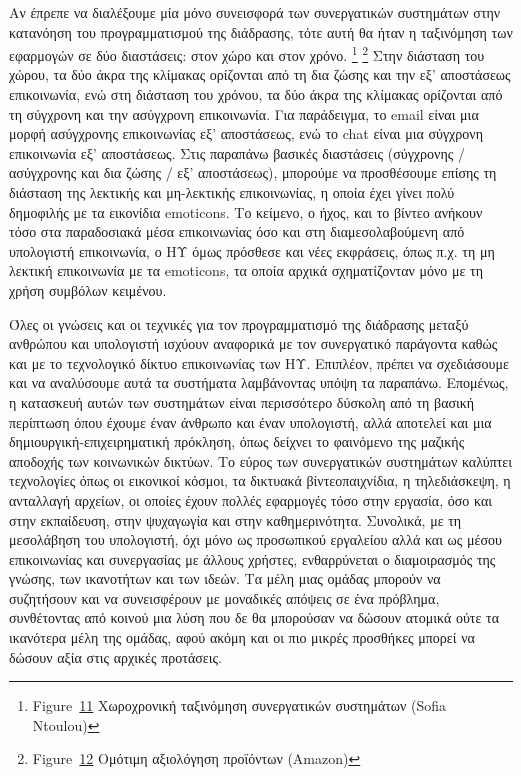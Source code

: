 \documentclass[
]{article}
\begin{document}
Αν έπρεπε να διαλέξουμε μία μόνο συνεισφορά των συνεργατικών συστημάτων
στην κατανόηση του προγραμματισμού της διάδρασης, τότε αυτή θα ήταν η
ταξινόμηση των εφαρμογών σε δύο διαστάσεις: στον χώρο και στον χρόνο.
\footnote{Figure~\protect\hyperlink{fig:time-space-cscw}{11} Χωροχρονική
  ταξινόμηση συνεργατικών συστημάτων (Sofia Ntoulou)} \footnote{Figure~\protect\hyperlink{fig:social-reviews}{12}
  Ομότιμη αξιολόγηση προϊόντων (Amazon)} Στην διάσταση του χώρου, τα δύο
άκρα της κλίμακας ορίζονται από τη δια ζώσης και την εξ' αποστάσεως
επικοινωνία, ενώ στη διάσταση του χρόνου, τα δύο άκρα της κλίμακας
ορίζονται από τη σύγχρονη και την ασύγχρονη επικοινωνία. Για παράδειγμα,
το email είναι μια μορφή ασύγχρονης επικοινωνίας εξ' αποστάσεως, ενώ το
chat είναι μια σύγχρονη επικοινωνία εξ' αποστάσεως. Στις παραπάνω
βασικές διαστάσεις (σύγχρονης / ασύγχρονης και δια ζώσης / εξ'
αποστάσεως), μπορούμε να προσθέσουμε επίσης τη διάσταση της λεκτικής και
μη-λεκτικής επικοινωνίας, η οποία έχει γίνει πολύ δημοφιλής με τα
εικονίδια emoticons. Το κείμενο, ο ήχος, και το βίντεο ανήκουν τόσο στα
παραδοσιακά μέσα επικοινωνίας όσο και στη διαμεσολαβούμενη από
υπολογιστή επικοινωνία, ο ΗΥ όμως πρόσθεσε και νέες εκφράσεις, όπως π.χ.
τη μη λεκτική επικοινωνία με τα emoticons, τα οποία αρχικά σχηματίζονταν
μόνο με τη χρήση συμβόλων κειμένου.

Όλες οι γνώσεις και οι τεχνικές για τον προγραμματισμό της διάδρασης
μεταξύ ανθρώπου και υπολογιστή ισχύουν αναφορικά με τον συνεργατικό
παράγοντα καθώς και με το τεχνολογικό δίκτυο επικοινωνίας των ΗΥ.
Επιπλέον, πρέπει να σχεδιάσουμε και να αναλύσουμε αυτά τα συστήματα
λαμβάνοντας υπόψη τα παραπάνω. Επομένως, η κατασκευή αυτών των
συστημάτων είναι περισσότερο δύσκολη από τη βασική περίπτωση όπου έχουμε
έναν άνθρωπο και έναν υπολογιστή, αλλά αποτελεί και μια
δημιουργική-επιχειρηματική πρόκληση, όπως δείχνει το φαινόμενο της
μαζικής αποδοχής των κοινωνικών δικτύων. Το εύρος των συνεργατικών
συστημάτων καλύπτει τεχνολογίες όπως οι εικονικοί κόσμοι, τα δικτυακά
βίντεοπαιχνίδια, η τηλεδιάσκεψη, η ανταλλαγή αρχείων, οι οποίες έχουν
πολλές εφαρμογές τόσο στην εργασία, όσο και στην εκπαίδευση, στην
ψυχαγωγία και στην καθημερινότητα. Συνολικά, με τη μεσολάβηση του
υπολογιστή, όχι μόνο ως προσωπικού εργαλείου αλλά και ως μέσου
επικοινωνίας και συνεργασίας με άλλους χρήστες, ενθαρρύνεται ο
διαμοιρασμός της γνώσης, των ικανοτήτων και των ιδεών. Τα μέλη μιας
ομάδας μπορούν να συζητήσουν και να συνεισφέρουν με μοναδικές απόψεις σε
ένα πρόβλημα, συνθέτοντας από κοινού μια λύση που δε θα μπορούσαν να
δώσουν ατομικά ούτε τα ικανότερα μέλη της ομάδας, αφού ακόμη και οι πιο
μικρές προσθήκες μπορεί να δώσουν αξία στις αρχικές προτάσεις.
\end{document}
